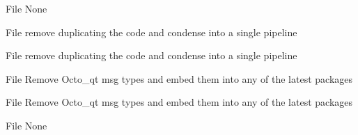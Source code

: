 \begin{DoxyRefList}
\item[File \doxylink{publisher_8h}{publisher.h} ]\label{todo__todo000010}%
%
None  
\item[File \doxylink{recordcams_8cpp}{recordcams.cpp} ]\label{todo__todo000011}%
%
remove duplicating the code and condense into a single pipeline  
\item[File \doxylink{recordcams_8h}{recordcams.h} ]\label{todo__todo000012}%
%
remove duplicating the code and condense into a single pipeline  
\item[File \doxylink{rosthread_8cpp}{rosthread.cpp} ]\label{todo__todo000013}%
%
Remove Octo\+\_\+qt msg types and embed them into any of the latest packages  
\item[File \doxylink{rosthread_8h}{rosthread.h} ]\label{todo__todo000014}%
%
Remove Octo\+\_\+qt msg types and embed them into any of the latest packages  
\item[File \doxylink{SplashScreen_8qml}{Splash\+Screen.qml} ]\label{todo__todo000021}%
%
None 
\end{DoxyRefList}